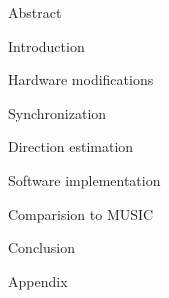 


\usepackage{antropy_en}


  

  \begin{topchapter}{Abstract}
    
  \end{topchapter}

  \begin{topchapter}{Introduction}
    
  \end{topchapter}

  \begin{topchapter}{Hardware modifications}
    
  \end{topchapter}

  \begin{topchapter}{Synchronization}
    
  \end{topchapter}

  \begin{topchapter}{Direction estimation}
    
  \end{topchapter}

  \begin{topchapter}{Software implementation}
    
  \end{topchapter}

  \begin{topchapter}{Comparision to MUSIC}
    
  \end{topchapter}

  \begin{topchapter}{Conclusion}
    
  \end{topchapter}

  \newpage

  \begin{topchapter}{Appendix}
    
  \end{topchapter}

  \printbibliography

